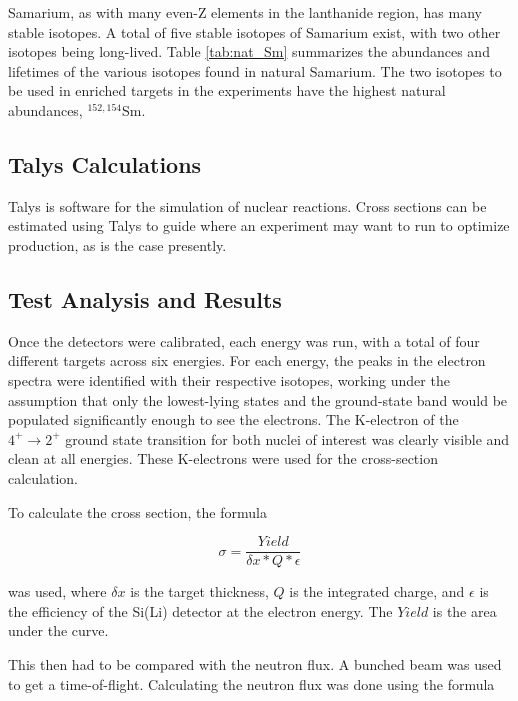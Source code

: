 Samarium, as with many even-Z elements in the lanthanide region, has many stable isotopes. A total of five stable isotopes of Samarium exist, with two other isotopes being long-lived. Table \ref{tab:nat_Sm} summarizes the abundances and lifetimes of the various isotopes found in natural Samarium. The two isotopes to be used in enriched targets in the experiments have the highest natural abundances, $^{152,154}$Sm.



\subsection{Talys Calculations}

Talys \citep{koning07:_talys} is software for the simulation of nuclear reactions. Cross sections can be estimated using Talys to guide where an experiment may want to run to optimize production, as is the case presently. 

\subsection{Test Analysis and Results}

Once the detectors were calibrated, each energy was run, with a total of four different targets across six energies. For each energy, the peaks in the electron spectra were identified with their respective isotopes, working under the assumption that only the lowest-lying states and the ground-state band would be populated significantly enough to see the electrons. The K-electron of the $4^+\rightarrow2^+$ ground state transition for both nuclei of interest was clearly visible and clean at all energies. These K-electrons were used for the cross-section calculation.

To calculate the cross section, the formula

\begin{equation}
    \sigma=\frac{Yield}{\delta x*Q*\epsilon}
    \label{eq:xs}
\end{equation}

was used, where $\delta x$ is the target thickness, $Q$ is the integrated charge, and $\epsilon$ is the efficiency of the Si(Li) detector at the electron energy. The $Yield$ is the area under the curve.

This then had to be compared with the neutron flux. A bunched beam was used to get a time-of-flight. Calculating the neutron flux was done using the formula

